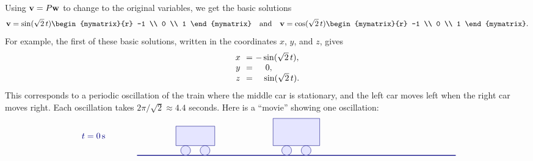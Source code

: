 \begin{solution}
\begin{itemize}
    Using $\mbox{\bf v} = P\mbox{\bf w}$ to change to the original variables,
    we get the basic solutions
    \begin{equation*}
      \vect{v}
      = \sin(\sqrt{2}\,t)\begin{mymatrix}{r} -1 \\ 0 \\ 1 \end{mymatrix}
      \quad\mbox{and}\quad
      \vect{v}
      = \cos(\sqrt{2}\,t)\begin{mymatrix}{r} -1 \\ 0 \\ 1 \end{mymatrix}.
    \end{equation*}
    For example, the first of these basic solutions, written in the
    coordinates $x$, $y$, and $z$, gives
    \begin{equation*}
      \begin{array}{c@{~~}c@{~}l}
        x &=& -\sin(\sqrt{2}\,t), \\
        y &=& ~~~\,0, \\
        z &=& ~~~\sin(\sqrt{2}\,t). \\
      \end{array}
    \end{equation*}
    This corresponds to a periodic oscillation of the train where the
    middle car is stationary, and the left car moves left when the
    right car moves right. Each oscillation takes
    $2\pi/\sqrt{2}\approx 4.4$ seconds.  Here is a ``movie'' showing
    one oscillation:
    \begin{equation*}
      \begin{tikzpicture}[scale=0.8, color=blue!50!black]
        \begin{scope}[yshift=0cm]
          \draw (-3,1) node[right] {$t=0\s$};
          \draw[thick] (0,0) -- (16.4,0);
          \begin{scope}[xshift=0cm]
            \draw[fill=blue!10] (2,0.5) rectangle (4,1.5);
            \draw[fill=blue!10] (2.5,0.25) circle (0.25);
            \draw[fill=blue!10] (3.5,0.25) circle (0.25);
          \end{scope}
          \begin{scope}[xshift=5.2cm]
            \draw[fill=blue!10] (1.8,0.5) rectangle (4.2,1.9);
            \draw[fill=blue!10] (2.5,0.25) circle (0.25);
            \draw[fill=blue!10] (3.5,0.25) circle (0.25);
          \end{scope}
          \begin{scope}[xshift=10.4cm]

\end{scope}
\end{scope}
\end{tikzpicture}
\end{equation*}
\end{itemize}
\end{solution}
